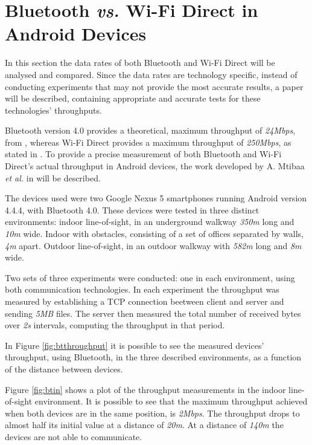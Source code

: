 \section{Bluetooth \textit{vs.} Wi-Fi Direct in Android Devices}
\label{sec:btvswifi}

In this section the data rates of both Bluetooth and Wi-Fi Direct will be analysed and compared. Since the data rates are technology specific, instead of conducting experiments that may not provide the most accurate results, a paper will be described, containing appropriate and accurate tests for these technologies' throughputs.

Bluetooth version 4.0 provides a theoretical, maximum throughput of \textit{24Mbps}, from \cite{bluetoothspec}, whereas Wi-Fi Direct provides a maximum throughput of \textit{250Mbps}, as stated in \cite{wfdrate}. To provide a precise measurement of both Bluetooth and Wi-Fi Direct's actual throughput in Android devices, the work developed by A. Mtibaa \textit{et al.} in \cite{throughputpaper} will be described. 

The devices used were two Google Nexus 5 smartphones running Android version 4.4.4, with Bluetooth 4.0. These devices were tested in three distinct environments: indoor line-of-sight, in an underground walkway \textit{350m} long and \textit{10m} wide. Indoor with obstacles, consisting of a set of offices separated by walls, \textit{4m} apart. Outdoor line-of-sight, in an outdoor walkway with \textit{582m} long and \textit{8m} wide.

Two sets of three experiments were conducted: one in each environment, using both communication technologies. In each experiment the throughput was measured by establishing a \gls{TCP} connection beetween client and server and sending \textit{5MB} files. The server then measured the total number of received bytes over \textit{2s} intervals, computing the throughput in that period.

In Figure \ref{fig:btthroughput} it is possible to see the measured devices' throughput, using Bluetooth, in the three described environments, as a function of the distance between devices.

Figure \ref{fig:btin} shows a plot of the throughput measurements in the indoor line-of-sight environment. It is possible to see that the maximum throughput achieved when both devices are in the same position, is \textit{2Mbps}. The throughput drops to almost half its initial value at a distance of \textit{20m}. At a distance of \textit{140m} the devices are not able to communicate.

